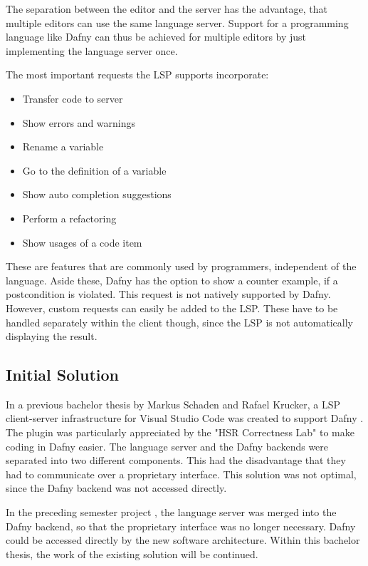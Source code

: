 The separation between the editor and the server has the advantage, that multiple editors can use the same language server.
Support for a programming language like Dafny can thus be achieved for multiple editors by just implementing the language server once.

The most important requests the LSP supports incorporate:
\begin{itemize}
    \item Transfer code to server
    \item Show errors and warnings
    \item Rename a variable
    \item Go to the definition of a variable
    \item Show auto completion suggestions
    \item Perform a refactoring
    \item Show usages of a code item
\end{itemize}
These are features that are commonly used by programmers, independent of the language.
Aside these, Dafny has the option to show a counter example, if a postcondition is violated.
This request is not natively supported by Dafny.
However, custom requests can easily be added to the LSP.
These have to be handled separately within the client though, since the LSP is not automatically displaying the result.


\subsection{Initial Solution}
\label{section:management_summary:initialsolution}
In a previous bachelor thesis by Markus Schaden and Rafael Krucker, a LSP client-server infrastructure for Visual Studio Code was created to support Dafny \cite{ba}.
The plugin was particularly appreciated by the "HSR Correctness Lab" \cite{correctnessLab} to make coding in Dafny easier.
The language server and the Dafny backends were separated into two different components.
This had the disadvantage that they had to communicate over a proprietary interface.
This solution was not optimal, since the Dafny backend was not accessed directly.

In the preceding semester project \cite{sa}, the language server was merged into the Dafny backend, so that the proprietary interface was no longer necessary.
Dafny could be accessed directly by the new software architecture.
Within this bachelor thesis, the work of the existing solution will be continued.


